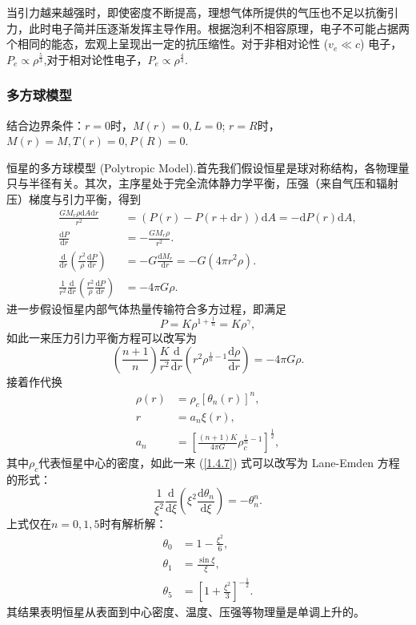 \documentclass[../天体物理基础.tex]{subfiles}
\begin{document}
当引力越来越强时，即使密度不断提高，理想气体所提供的气压也不足以抗衡引力，此时电子简并压逐渐发挥主导作用。根据泡利不相容原理，电子不可能占据两个相同的能态，宏观上呈现出一定的抗压缩性。对于非相对论性 ($v_{e}\ll c$) 电子，$P_{e}\propto\rho^{\frac{5}{3}}$,对于相对论性电子，$P_{e}\propto\rho^{\frac{4}{3}}$.

\subsubsection{多方球模型}
结合边界条件：$r=0$时，$M\left(r\right)=0,L=0$; $r=R$时，$M\left(r\right)=M,T\left(r\right)=0,P\left(R\right)=0$.

恒星的多方球模型 (Polytropic Model).首先我们假设恒星是球对称结构，各物理量只与半径有关。其次，主序星处于完全流体静力学平衡，压强（来自气压和辐射压）梯度与引力平衡，得到
\begin{align}
\frac{GM_{r}\rho\mathrm{d}A\mathrm{d}r}{r^{2}}&=\left(P\left(r\right)-P\left(r+\mathrm{d}r\right)\right)\mathrm{d}A=-\mathrm{d}P\left(r\right)\mathrm{d}A,\\
\frac{\mathrm{d}P}{\mathrm{d}r}&=-\frac{GM_{r}\rho}{r^{2}}.\\
\frac{\mathrm{d}}{\mathrm{d}r}\left(\frac{r^{2}}{\rho}\frac{\mathrm{d}P}{\mathrm{d}r}\right)&=-G\frac{\mathrm{d}M_{r}}{\mathrm{d}r}=-G\left(4\pi r^{2}\rho\right).\\
\frac{1}{r^{2}}\frac{\mathrm{d}}{\mathrm{d}r}\left(\frac{r^{2}}{\rho}\frac{\mathrm{d}P}{\mathrm{d}r}\right)&=-4\pi{}G\rho.
\end{align}
进一步假设恒星内部气体热量传输符合多方过程，即满足
\begin{equation}
P=K\rho^{1+\frac{1}{n}}=K\rho^{\gamma},
\end{equation}
如此一来压力引力平衡方程可以改写为
\begin{equation}
\left(\frac{n+1}{n}\right)\frac{K}{r^{2}}\frac{\mathrm{d}}{\mathrm{d}r}\left(r^{2}\rho^{\frac{1}{n}-1}\frac{\mathrm{d}\rho}{\mathrm{d}r}\right)=-4\pi G\rho.\label{1.4.7}
\end{equation}
接着作代换
\begin{align}
\rho\left(r\right)&=\rho_{c}\left[\theta_{n}\left(r\right)\right]^{n},\\
r&=a_{n}\xi\left(r\right),\\
a_{n}&=\left[\frac{\left(n+1\right)K}{4\pi G}\rho_{c}^{\frac{1}{n}-1}\right]^{\frac{1}{2}},
\end{align}
其中$\rho_{c}$代表恒星中心的密度，如此一来 (\ref{1.4.7}) 式可以改写为 Lane-Emden 方程的形式：
\begin{equation}
\frac{1}{\xi^{2}}\frac{\mathrm{d}}{\mathrm{d}\xi}\left(\xi^{2}\frac{\mathrm{d}\theta_{n}}{\mathrm{d}\xi}\right)=-\theta_{n}^{n}.
\end{equation}
上式仅在$n=0,1,5$时有解析解：
\begin{align}
\theta_{0}&=1-\frac{\xi^{2}}{6},\\
\theta_{1}&=\frac{\sin\xi}{\xi},\\
\theta_{5}&=\left[1+\frac{\xi^{2}}{3}\right]^{-\frac{1}{2}}.
\end{align}
其结果表明恒星从表面到中心密度、温度、压强等物理量是单调上升的。
\end{document}
